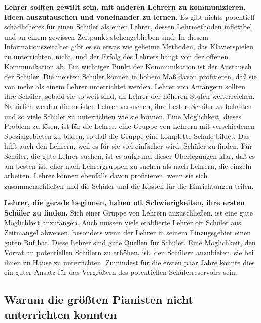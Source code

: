 \textbf{Lehrer sollten gewillt sein, mit anderen Lehrern zu kommunizieren, Ideen auszutauschen und voneinander zu lernen.}
Es gibt nichts potentiell schädlicheres für einen Schüler als einen Lehrer, dessen Lehrmethoden inflexibel und an einem gewissen Zeitpunkt stehengeblieben sind.
In diesem Informationszeitalter gibt es so etwas wie geheime Methoden, das Klavierspielen zu unterrichten, nicht, und der Erfolg des Lehrers hängt von der offenen Kommunikation ab.
Ein wichtiger Punkt der Kommunikation ist der Austausch der Schüler.
Die meisten Schüler können in hohem Maß davon profitieren, daß sie von mehr als einem Lehrer unterrichtet werden.
Lehrer von Anfängern sollten ihre Schüler, sobald sie so weit sind, an Lehrer der höheren Stufen weiterreichen.
Natürlich werden die meisten Lehrer versuchen, ihre besten Schüler zu behalten und so viele Schüler zu unterrichten wie sie können.
Eine Möglichkeit, dieses Problem zu lösen, ist für die Lehrer, eine Gruppe von Lehrern mit verschiedenen Spezialgebieten zu bilden, so daß die Gruppe eine komplette Schule bildet.
Das hilft auch den Lehrern, weil es für sie viel einfacher wird, Schüler zu finden.
Für Schüler, die gute Lehrer suchen, ist es aufgrund dieser Überlegungen klar, daß es am besten ist, eher nach Lehrergruppen zu suchen als nach Lehrern, die einzeln arbeiten.
Lehrer können ebenfalls davon profitieren, wenn sie sich zusammenschließen und die Schüler und die Kosten für die Einrichtungen teilen.

\textbf{Lehrer, die gerade beginnen, haben oft Schwierigkeiten, ihre ersten Schüler zu finden.}
Sich einer Gruppe von Lehrern anzuschließen, ist eine gute Möglichkeit anzufangen.
Auch müssen viele etablierte Lehrer oft Schüler aus Zeitmangel abweisen, besonders wenn der Lehrer in seinem Einzugsgebiet einen guten Ruf hat.
Diese Lehrer sind gute Quellen für Schüler.
Eine Möglichkeit, den Vorrat an potentiellen Schülern zu erhöhen, ist, den Schülern anzubieten, sie bei ihnen zu Hause zu unterrichten.
Zumindest für die ersten paar Jahre könnte dies ein guter Ansatz für das Vergrößern des potentiellen Schülerreservoirs sein.


\subsection{Warum die größten Pianisten nicht unterrichten konnten}\hypertarget{c1iii16e}{}

